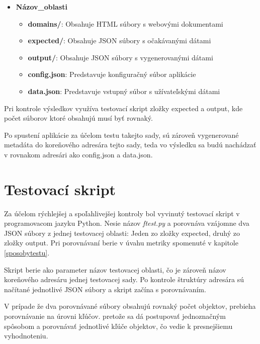 \begin{itemize}
    \item 
    {
    \textbf{Názov\_oblasti}
        \begin{itemize}
            \item \textbf{domains/}: Obsahuje HTML súbory s webovými dokumentami
            \item \textbf{expected/}: Obsahuje JSON súbory s očakávanými dátami
            \item \textbf{output/}: Obsahuje JSON súbory s vygenerovanými dátami
            \item \textbf{config.json}: Predstavuje konfiguračný súbor aplikácie
            \item \textbf{data.json}: Predstavuje vstupný súbor s užívateľskými dátami
        \end{itemize}
    }
\end{itemize}

\bigskip

Pri kontrole výsledkov využíva testovací skript zložky expected a output, kde počet súborov ktoré obsahujú musí byť rovnaký.

Po spustení aplikácie za účelom testu takejto sady, sú zároveň vygenerované metadáta do koreňového adresára tejto sady, teda vo výsledku sa budú nachádzať v rovnakom adresári ako config.json a data.json.

\newpage

\section{Testovací skript}

Za účelom rýchlejšej a spoľahlivejšej kontroly bol vyvinutý testovací skript v programovacom jazyku Python. Nesie názov \textit{ftest.py} a porovnáva vzájomne dva JSON súbory z jednej testovacej oblasti: Jeden zo zložky expected, druhý zo zložky output. Pri porovnávaní berie v úvahu metriky spomenuté v kapitole \ref{sposobytestu}.

Skript berie ako parameter názov testovacej oblasti, čo je zároveň názov koreňového adresáru jednej testovacej sady. Po kontrole štruktúry adresára sú načítané jednotlivé JSON súbory a skript začína s porovnávaním.

V prípade že dva porovnávané súbory obsahujú rovnaký počet objektov, prebieha porovnávanie na úrovni kľúčov. pretože sa dá postupovať jednoznačným spôsobom a porovnávať jednotlivé kľúče objektov, čo vedie k presnejšiemu vyhodnoteniu. 

